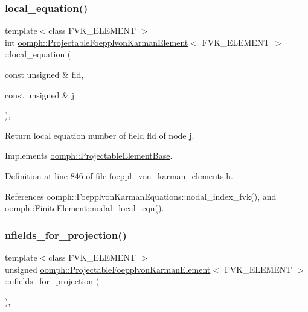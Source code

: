 \subsubsection{\texorpdfstring{local\+\_\+equation()}{local\_equation()}}
{\footnotesize\ttfamily template$<$class F\+V\+K\+\_\+\+E\+L\+E\+M\+E\+NT $>$ \\
int \hyperlink{classoomph_1_1ProjectableFoepplvonKarmanElement}{oomph\+::\+Projectable\+Foepplvon\+Karman\+Element}$<$ F\+V\+K\+\_\+\+E\+L\+E\+M\+E\+NT $>$\+::local\+\_\+equation (\begin{DoxyParamCaption}\item[{const unsigned \&}]{fld,  }\item[{const unsigned \&}]{j }\end{DoxyParamCaption})\hspace{0.3cm}{\ttfamily [inline]}, {\ttfamily [virtual]}}



Return local equation number of field fld of node j. 



Implements \hyperlink{classoomph_1_1ProjectableElementBase_ac5c27ae929ff636dc7747fe23fd4f738}{oomph\+::\+Projectable\+Element\+Base}.



Definition at line 846 of file foeppl\+\_\+von\+\_\+karman\+\_\+elements.\+h.



References oomph\+::\+Foepplvon\+Karman\+Equations\+::nodal\+\_\+index\+\_\+fvk(), and oomph\+::\+Finite\+Element\+::nodal\+\_\+local\+\_\+eqn().

\mbox{\label{classoomph_1_1ProjectableFoepplvonKarmanElement_aaa74e7c246f86929e7ceeeced8819d6c}} 
\subsubsection{\texorpdfstring{nfields\+\_\+for\+\_\+projection()}{nfields\_for\_projection()}}
{\footnotesize\ttfamily template$<$class F\+V\+K\+\_\+\+E\+L\+E\+M\+E\+NT $>$ \\
unsigned \hyperlink{classoomph_1_1ProjectableFoepplvonKarmanElement}{oomph\+::\+Projectable\+Foepplvon\+Karman\+Element}$<$ F\+V\+K\+\_\+\+E\+L\+E\+M\+E\+NT $>$\+::nfields\+\_\+for\+\_\+projection (\begin{DoxyParamCaption}{ }\end{DoxyParamCaption})\hspace{0.3cm}{\ttfamily [inline]}, {\ttfamily [virtual]}}




